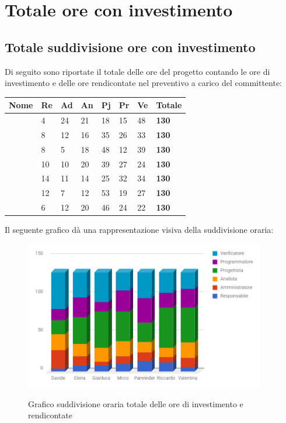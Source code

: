 \documentclass[PianoDiProgetto.tex]{subfiles}
\begin{document}
\section{Totale ore con investimento}
\subsection{Totale suddivisione ore con investimento}
Di seguito sono riportate il totale delle ore del progetto contando le ore di investimento e delle ore rendicontate nel preventivo a carico del committente:
\begin{center}
\begin{table}[htbp]
	\centering
	\renewcommand\arraystretch{1.5}
	\begin{tabularx}{\textwidth}{p{4cm}|p{1cm}|p{1cm}|p{1cm}|p{1cm}|p{1cm}|p{1cm}|p{2cm}}
		\hline
		\textbf{Nome} & \textbf{Re} & \textbf{Ad} & \textbf{An} & \textbf{Pj} & \textbf{Pr} & \textbf{Ve} & \textbf{Totale} \\
		\hline
		\Davide & 4 & 24 & 21 & 18 & 15 & 48 & \textbf{130} \\
		\hline
		\Elena & 8 & 12 & 16 & 35 & 26 & 33 & \textbf{130} \\
		\hline
		\Gianluca & 8 & 5 & 18 & 48 & 12 & 39 & \textbf{130} \\
		\hline
		\Mirco & 10 & 10 & 20 & 39 & 27 & 24 & \textbf{130} \\
		\hline
		\Parwinder & 14 & 11 & 14 & 25 & 32 & 34 & \textbf{130} \\
		\hline
		\Riccardo & 12 & 7 & 12 & 53 & 19 & 27 & \textbf{130} \\
		\hline
		\Valentina & 6 & 12 & 20 & 46 & 24 & 22 & \textbf{130} \\
		\hline
	\end{tabularx}
\end{table}
\end{center}
Il seguente grafico dà una rappresentazione visiva della suddivisione oraria:
\begin{figure}[h]
	\centering
	\includegraphics[width=10.5cm]{images/prospettoOrario/totale.png}
	\label{fig:foo}
	\caption{Grafico suddivisione oraria totale delle ore di investimento e rendicontate}
\end{figure} 
\clearpage
\end{document}
